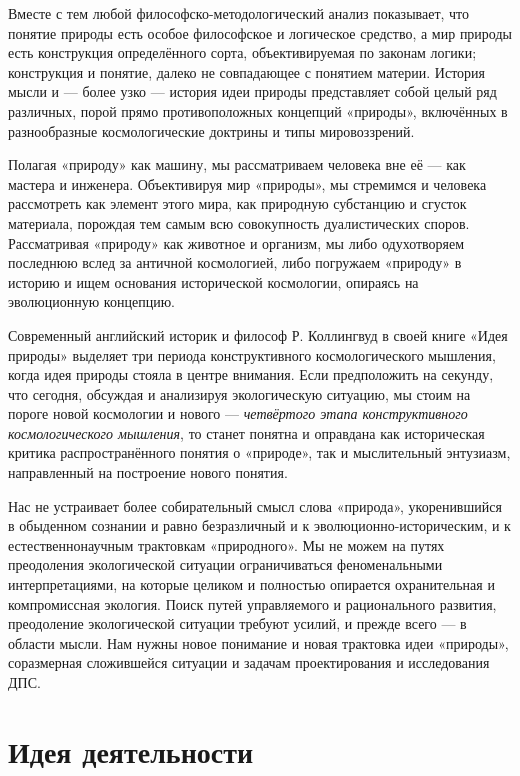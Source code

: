 \documentclass[11pt,a4paper]{article}
\begin{document}
Вместе с тем любой философско-методологический анализ показывает, что понятие
природы есть особое философское и логическое средство, а мир природы есть
конструкция определённого сорта, объективируемая по законам логики;
конструкция и понятие, далеко не совпадающее с понятием материи. История мысли
и — более узко — история идеи природы представляет собой целый ряд различных,
порой прямо противоположных концепций «природы», включённых в разнообразные
космологические доктрины и типы мировоззрений. 

Полагая «природу» как машину, мы рассматриваем человека вне её — как мастера и
инженера. Объективируя мир «природы», мы стремимся и человека рассмотреть как
элемент этого мира, как природную субстанцию и сгусток материала, порождая тем
самым всю совокупность дуалистических споров. Рассматривая «природу» как
животное и организм, мы либо одухотворяем последнюю вслед за античной
космологией, либо погружаем «природу» в историю и ищем основания исторической
космологии, опираясь на эволюционную концепцию. 

Современный английский историк и философ Р. Коллингвуд в своей книге «Идея
природы» выделяет три периода конструктивного космологического мышления, когда
идея природы стояла в центре внимания. Если предположить на секунду, что
сегодня, обсуждая и анализируя экологическую ситуацию, мы стоим на пороге
новой космологии и нового — \emph{четвёртого этапа конструктивного
  космологического мышления}, то станет понятна и оправдана как историческая
критика распространённого понятия о «природе», так и мыслительный энтузиазм,
направленный на построение нового понятия.

Нас не устраивает более собирательный смысл слова «природа», укоренившийся в
обыденном сознании и равно безразличный и к эволюционно-историческим, и к
естественнонаучным трактовкам «природного». Мы не можем на путях преодоления
экологической ситуации ограничиваться феноменальными интерпретациями, на
которые целиком и полностью опирается охранительная и компромиссная экология.
Поиск путей управляемого и рационального развития, преодоление экологической
ситуации требуют усилий, и прежде всего — в области мысли. Нам нужны новое
понимание и новая трактовка идеи «природы», соразмерная сложившейся ситуации и
задачам проектирования и исследования ДПС.

\section{Идея деятельности}
\end{document}
